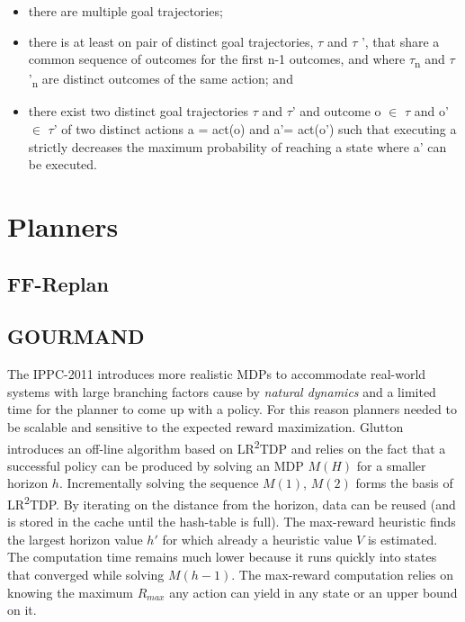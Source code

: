 \documentclass[runningheads,a4paper]{llncs}
\begin{document}
\begin{itemize}
	\item there are multiple goal trajectories;
	\item there is at least on pair of distinct goal trajectories, $\tau$ and $\tau$ ', that share a common sequence of outcomes for the first n-1 outcomes, and where $\tau$\textsubscript{n} and $\tau$'\textsubscript{n} are distinct outcomes of the same action; and
	\item there exist two distinct goal trajectories $\tau$ and $\tau$' and outcome o $\in$ $\tau$ and o' $\in$ $\tau$' of two distinct actions a = act(o) and a'= act(o') such that executing a strictly decreases the maximum probability of reaching a state where a' can be executed.
\end{itemize}

%



\section{Planners}
\label{sec:planners}

\subsection{FF-Replan}

\subsection{GOURMAND}

The IPPC-2011 introduces more realistic MDPs to accommodate real-world systems with large branching factors cause by \emph{natural dynamics} and a limited time for the planner to come up with a policy. For this reason planners needed to be scalable and sensitive to the expected reward maximization. Glutton introduces an off-line algorithm based on LR\textsuperscript{2}TDP and relies on the fact that a successful policy can be produced by solving an MDP $M(H)$ for a smaller horizon $h$. Incrementally solving the sequence $M(1)$, $M(2)$ forms the basis of LR\textsuperscript{2}TDP\@. By iterating on the distance from the horizon, data can be reused (and is stored in the cache until the hash-table is full). The max-reward heuristic finds the largest horizon value $h'$ for which already a heuristic value $V$ is estimated. The  computation time remains much lower because it runs quickly into states that converged while solving $M(h-1)$. The max-reward computation relies on knowing the maximum $R_{max}$ any action can yield in any state or an upper bound on it.
\end{document}
